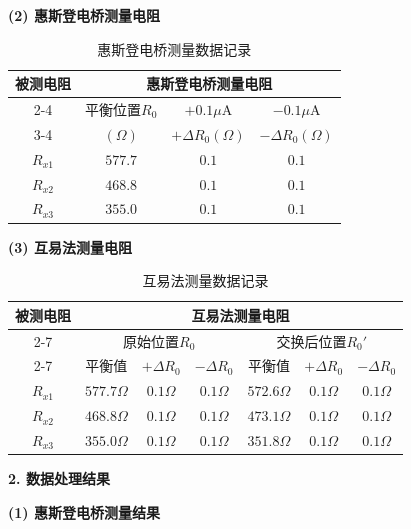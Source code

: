 ﻿\documentclass[12pt,a4paper]{article}
\begin{document}
\textbf{(2) 惠斯登电桥测量电阻}

\begin{table}[H]
    \centering
    \begin{tabular}{|c|c|c|c|}
        \hline
        \multirow{3}{*}{被测电阻} & \multicolumn{3}{c|}{惠斯登电桥测量电阻} \\
        \cline{2-4}
        & 平衡位置$R_0$ & $+0.1\mu\mathrm{A}$ & $-0.1\mu\mathrm{A}$ \\ 
        \cline{3-4}
        & $(\Omega)$ & $+\Delta R_0 (\Omega)$ & $-\Delta R_0 (\Omega)$ \\ 
        \hline
        $R_{x1}$ & $577.7$ & $0.1$ & $0.1$ \\
        \hline
        $R_{x2}$ & $468.8$ & $0.1$ & $0.1$ \\
        \hline
        $R_{x3}$ & $355.0$ & $0.1$ & $0.1$ \\
        \hline
    \end{tabular}
    \caption{惠斯登电桥测量数据记录}
    \label{tab:wheatstone}
\end{table}

\textbf{(3) 互易法测量电阻}

\begin{table}[H]
    \centering
    \begin{tabular}{|c|c|c|c|c|c|c|}
        \hline
        \multirow{3}{*}{被测电阻} & \multicolumn{6}{c|}{互易法测量电阻} \\
        \cline{2-7}
        & \multicolumn{3}{c|}{原始位置$R_0$} & \multicolumn{3}{c|}{交换后位置$R_0'$} \\
        \cline{2-7}
        & 平衡值 & $+\Delta R_0$ & $-\Delta R_0$ & 平衡值 & $+\Delta R_0$ & $-\Delta R_0$ \\
        \hline
        $R_{x1}$ & $577.7\Omega$ & $0.1\Omega$ & $0.1\Omega$ & $572.6\Omega$ & $0.1\Omega$ & $0.1\Omega$ \\
        \hline
        $R_{x2}$ & $468.8\Omega$ & $0.1\Omega$ & $0.1\Omega$ & $473.1\Omega$ & $0.1\Omega$ & $0.1\Omega$ \\
        \hline
        $R_{x3}$ & $355.0\Omega$ & $0.1\Omega$ & $0.1\Omega$ & $351.8\Omega$ & $0.1\Omega$ & $0.1\Omega$ \\
        \hline
    \end{tabular}
    \caption{互易法测量数据记录}
    \label{tab:interchange}
\end{table}

\textbf{2. 数据处理结果}

\textbf{(1) 惠斯登电桥测量结果}
\end{document}

